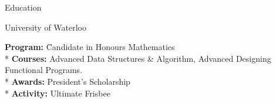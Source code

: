 \documentclass{article}
\newlength{\tabin}
\newlength{\secsep}
\newcommand{\lineunder}{\vspace*{-8pt} \\ \hspace*{-6pt} \hrulefill \\ \vspace*{-15pt}}
\newenvironment{tabbedsection}[1]{
  \begin{list}{}{
      \setlength{\itemsep}{0pt}
      \setlength{\labelsep}{0pt}
      \setlength{\labelwidth}{0pt}
      \setlength{\leftmargin}{\tabin}
      \setlength{\rightmargin}{\tabin}
      \setlength{\listparindent}{0pt}
      \setlength{\parsep}{0pt}
      \setlength{\parskip}{0pt}
      \setlength{\partopsep}{0pt}
      \setlength{\topsep}{#1}
    }
  \item[]
}{\end{list}}
\newenvironment{nospacetabbing}{
    \begin{tabbing}
}{\end{tabbing}\vspace{-1.2em}}
\newenvironment{resume_section}[1]{
  \filbreak
  \vspace{2\secsep}
  \textsc{\large#1}
  \lineunder
  \begin{tabbedsection}{\secsep}
}{\end{tabbedsection}}
\newenvironment{resume_subsection}[2][]{
  \textbf{#2} \hfill {\footnotesize #1} \hspace{-5.1em}
  \begin{tabbedsection}{0.5\secsep}
}{\end{tabbedsection}}
\begin{document}
\begin{resume_section}{Education}
  \begin{resume_subsection}[07/2022 - Present]{University of Waterloo}
    \begin{nospacetabbing}
      \textbf{Program:} \= Candidate in Honours Mathematics \\*
      \textbf{Courses:} \>Advanced Data Structures \& Algorithm, Advanced Designing Functional Programs. \\*
      \textbf{Awards:} \> President's Scholarship\\*
      \textbf{Activity:} \> Ultimate Frisbee
    \end{nospacetabbing}
  \end{resume_subsection}
\end{resume_section}



  
\end{document}
